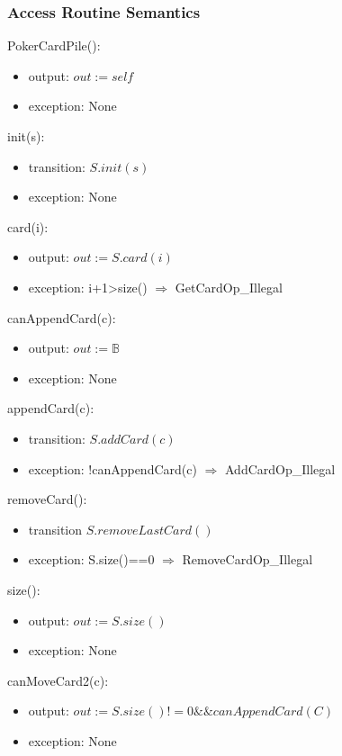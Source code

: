 \documentclass[12pt]{article}
\begin{document}
\subsubsection* {Access Routine Semantics}

PokerCardPile():
\begin{itemize}
\item output: $out := \mathit{self}$
\item exception: None
\end{itemize}

\noindent init(s):
\begin{itemize}
\item transition: $S.init(s)$
\item exception: None
\end{itemize}

\noindent card(i):
\begin{itemize}
\item output: $out := S.card(i)$
\item exception: i+1>size() $\Rightarrow$ GetCardOp\_Illegal
\end{itemize}

\noindent canAppendCard(c):
\begin{itemize}
\item output: $out := \mathbb{B}$
\item exception: None
\end{itemize}

\noindent appendCard(c):
\begin{itemize}
\item transition: $S.addCard(c)$
\item exception: !canAppendCard(c) $\Rightarrow$ AddCardOp\_Illegal
\end{itemize}

\noindent removeCard():
\begin{itemize}
\item transition $S.removeLastCard()$
\item exception: S.size()==0 $\Rightarrow$ RemoveCardOp\_Illegal
\end{itemize}

\noindent size():
\begin{itemize}
\item output: $out := S.size()$
\item exception: None
\end{itemize}

\noindent canMoveCard2(c):
\begin{itemize}
\item output: $out := S.size()!=0 \&\& canAppendCard(C)$
\item exception: None
\end{itemize}
\end{document}
